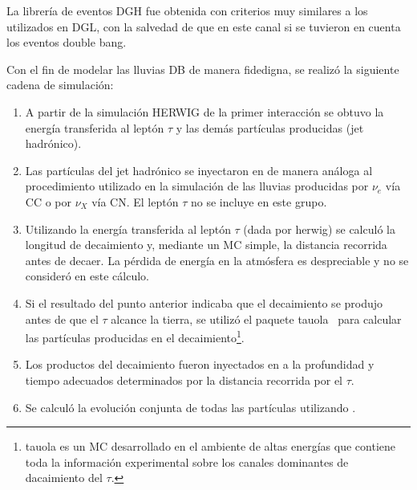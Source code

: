 		La librería de eventos DGH fue obtenida con criterios muy similares a los utilizados en DGL, con la salvedad de que en este canal si se tuvieron en cuenta los eventos double bang.
		
		Con el fin de modelar las lluvias DB de manera fidedigna, se realizó la siguiente cadena de simulación:
		\begin{enumerate}
		\item A partir de la simulación HERWIG de la primer interacción se obtuvo la energía transferida al leptón $\tau$ y las demás partículas producidas (jet hadrónico).
		\item Las partículas del jet hadrónico se inyectaron en \aires{} de manera análoga al procedimiento utilizado en la simulación de las lluvias producidas por $\nu_{e}$ vía CC o por $\nu_{X}$ vía CN. El leptón $\tau$ no se incluye en este grupo.
		\item Utilizando la energía transferida al leptón $\tau$ (dada por {\sc herwig}) se calculó la longitud de decaimiento y, mediante un MC simple, la distancia recorrida antes de decaer. La pérdida de energía en la atmósfera es despreciable y no se consideró en este cálculo.
		\item Si el resultado del punto anterior indicaba que el decaimiento se produjo antes de que el $\tau$ alcance la tierra, se utilizó el paquete {\sc tauola}~\cite{cite:TAUOLA} para calcular las partículas producidas en el decaimiento\footnote{{\sc tauola} es un MC desarrollado en el ambiente de altas energías que contiene toda la información experimental sobre los canales dominantes de dacaimiento del $\tau$. }.
		\item Los productos del decaimiento fueron inyectados en \aires{} a la profundidad y tiempo adecuados determinados por la distancia recorrida por el $\tau$.
		\item Se calculó la evolución conjunta de todas las partículas utilizando \aires{}.
		\end{enumerate}
		
